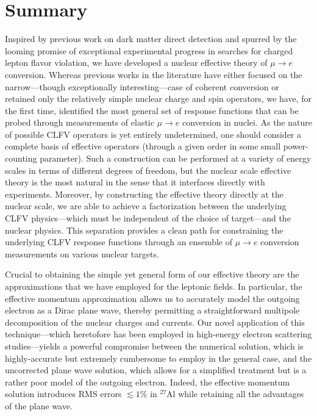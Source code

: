 \documentclass{book}[letterpaper,12pt]
\begin{document}
\section{Summary}
Inspired by previous work on dark matter direct detection and spurred by the looming promise of exceptional experimental progress in searches for charged lepton flavor violation, we have developed a nuclear effective theory of $\mu\rightarrow e$ conversion. Whereas previous works in the literature have either focused on the narrow---though exceptionally interesting---case of coherent conversion or retained only the relatively simple nuclear charge and spin operators, we have, for the first time, identified the most general set of response functions that can be probed through measurements of elastic $\mu\rightarrow e$ conversion in nuclei. As the nature of possible CLFV operators is yet entirely undetermined, one should consider a complete basis of effective operators (through a given order in some small power-counting parameter). Such a construction can be performed at a variety of energy scales in terms of different degrees of freedom, but the nuclear scale effective theory is the most natural in the sense that it interfaces directly with experiments. Moreover, by constructing the effective theory directly at the nuclear scale, we are able to achieve a factorization between the underlying CLFV physics---which must be independent of the choice of target---and the nuclear physics. This separation provides a clean path for constraining the underlying CLFV response functions through an ensemble of $\mu\rightarrow e$ conversion measurements on various nuclear targets. 

Crucial to obtaining the simple yet general form of our effective theory are the approximations that we have employed for the leptonic fields. In particular, the effective momentum approximation allows us to accurately model the outgoing electron as a Dirac plane wave, thereby permitting a straightforward multipole decomposition of the nuclear charges and currents. Our novel application of this technique---which heretofore has been employed in high-energy electron scattering studies---yields a powerful compromise between the numerical solution, which is highly-accurate but extremely cumbersome to employ in the general case, and the uncorrected plane wave solution, which allows for a simplified treatment but is a rather poor model of the outgoing electron. Indeed, the effective momentum solution introduces RMS errors $\lesssim 1\%$ in $^{27}$Al while retaining all the advantages of the plane wave.
\end{document}
